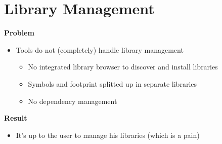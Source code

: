 \section{Library Management}

\begin{frame}{\secname}
  \textbf{Problem}
  \begin{itemize}
    \item Tools do not (completely) handle library management
    \begin{itemize}
      \item No integrated library browser to discover and install libraries
      \item Symbols and footprint splitted up in separate libraries
      \item No dependency management
    \end{itemize}
  \end{itemize}
  
  \pause
  
  \textbf{Result}
  \begin{itemize}
    \item It's up to the user to manage his libraries (which is a pain)
  \end{itemize}
\end{frame}

